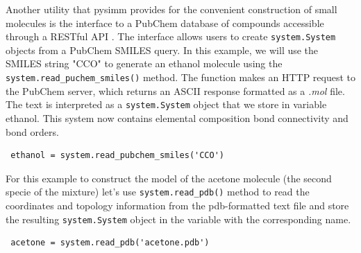 \documentclass[9pt,tutorial]{livecoms}
\begin{document}
Another utility that pysimm provides for the convenient construction of small molecules is the interface to a PubChem database of compounds accessible through a RESTful API \cite{restful}. The interface allows users to create \lstinline$system.System$ objects from a PubChem SMILES query. In this example, we will use the SMILES string "CCO" to generate an ethanol molecule using the \lstinline$system.read_puchem_smiles()$ method. The function makes an HTTP request to the PubChem server, which returns an ASCII response formatted as a \textit{.mol} file. The text is interpreted as a \lstinline$system.System$ object that we store in variable ethanol. This system now contains elemental composition bond connectivity and bond orders.

\begin{lstlisting}
 ethanol = system.read_pubchem_smiles('CCO')
\end{lstlisting}
For this example to construct the model of the acetone molecule (the second specie of the mixture) let's use \lstinline$system.read_pdb()$ method to read the coordinates and topology information from the pdb-formatted text file and store the resulting \lstinline$system.System$ object in the variable with the corresponding name.

\begin{lstlisting}
 acetone = system.read_pdb('acetone.pdb')
\end{lstlisting}
\end{document}
